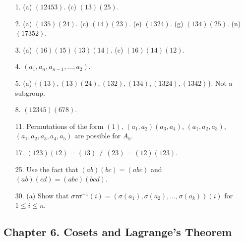 {\small
\begin{itemize}
 
 
\item[1.]
(a) $(12453)$.
(c) $(13)(25)$.
 
 
\item[2.]
(a) $(135)(24)$.
(c) $(14)(23)$.
(e) $(1324)$.
(g) $(134)(25)$.
(n) $(17352)$. 
 
 
\item[3.]
(a) $(16)(15)(13)(14)$.
(c) $(16)(14)(12)$.
 
\item[4.]
$(a_1, a_{n}, a_{n-1}, \ldots, a_2)$.
  
 
\item[5.]
(a) $\{ (13), (13)(24), (132), (134), (1324), (1342) \}$. 
Not a subgroup.
 
 
\item[8.]
$(12345)(678)$.
 
 
\item[11.]
Permutations of the form $(1)$, $(a_1, a_2)(a_3, a_4)$, 
$(a_1, a_2, a_3)$, $(a_1, a_2, a_3, a_4, a_5)$ are possible for $A_5$.
 
\item[17.]
$(123)(12) = (13) \neq (23) = (12)(123)$.
 
 
\item[25.]
Use the fact that $(ab)(bc) = (abc)$ and $(ab)(cd) = (abc)(bcd)$.
 
 
\item[30.]
(a) 
Show that $\sigma \tau \sigma^{-1 }(i) = ( \sigma(a_1), 
\sigma(a_2), \ldots, \sigma(a_k))(i)$ for $1 \leq i \leq n$.
 
 
\end{itemize}
}
 
\subsection*{Chapter 6. Cosets and Lagrange's Theorem}
 
